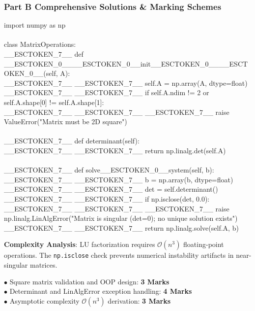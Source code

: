 \subsubsection*{Part B Comprehensive Solutions \& Marking Schemes}

\begin{solutionbox}
\begin{pycode}
import numpy as np\\
~\\
class MatrixOperations:\\
\_\_ESCTOKEN\_7\_\_ def \_\_ESCTOKEN\_0\_\_\_\_ESCTOKEN\_0\_\_init\_\_ESCTOKEN\_0\_\_\_\_ESCTOKEN\_0\_\_(self, A):\\
\_\_ESCTOKEN\_7\_\_ \_\_ESCTOKEN\_7\_\_ self.A = np.array(A, dtype=float)\\
\_\_ESCTOKEN\_7\_\_ \_\_ESCTOKEN\_7\_\_ if self.A.ndim != 2 or self.A.shape[0] != self.A.shape[1]:\\
\_\_ESCTOKEN\_7\_\_ \_\_ESCTOKEN\_7\_\_ \_\_ESCTOKEN\_7\_\_ raise ValueError("Matrix must be 2D square")\\
~\\
\_\_ESCTOKEN\_7\_\_ def determinant(self):\\
\_\_ESCTOKEN\_7\_\_ \_\_ESCTOKEN\_7\_\_ return np.linalg.det(self.A)\\
~\\
\_\_ESCTOKEN\_7\_\_ def solve\_\_ESCTOKEN\_0\_\_system(self, b):\\
\_\_ESCTOKEN\_7\_\_ \_\_ESCTOKEN\_7\_\_ b = np.array(b, dtype=float)\\
\_\_ESCTOKEN\_7\_\_ \_\_ESCTOKEN\_7\_\_ det = self.determinant()\\
\_\_ESCTOKEN\_7\_\_ \_\_ESCTOKEN\_7\_\_ if np.isclose(det, 0.0):\\
\_\_ESCTOKEN\_7\_\_ \_\_ESCTOKEN\_7\_\_ \_\_ESCTOKEN\_7\_\_ raise np.linalg.LinAlgError("Matrix is singular (det=0); no unique solution exists")\\
\_\_ESCTOKEN\_7\_\_ \_\_ESCTOKEN\_7\_\_ return np.linalg.solve(self.A, b)
\end{pycode}
\textbf{Complexity Analysis}: LU factorization requires $\mathcal{O}(n^3)$ floating-point operations. The \texttt{np.isclose} check prevents numerical instability artifacts in near-singular matrices.
\begin{markingrubric}
$\bullet$ Square matrix validation and OOP design: \textbf{3 Marks}\\$\bullet$ Determinant and LinAlgError exception handling: \textbf{4 Marks}\\$\bullet$ Asymptotic complexity $\mathcal{O}(n^3)$ derivation: \textbf{3 Marks}
\end{markingrubric}
\end{solutionbox}

